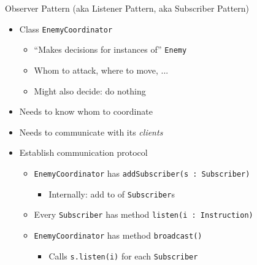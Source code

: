 
\begin{frame}{Observer Pattern (aka Listener Pattern, aka Subscriber Pattern)}
%
\begin{itemize}
\item Class \texttt{EnemyCoordinator}
	\begin{itemize}
	\item \enquote{Makes decisions for instances of} \texttt{Enemy}
	\item Whom to attack, where to move, ...
	\item Might also decide: do nothing
	\end{itemize}
\item[\Thus] Needs to know whom to coordinate
\item[\Thus] Needs to communicate with its \emph{clients}
\pause
\item[\Thus] Establish communication protocol
	\begin{itemize}
	\item \texttt{EnemyCoordinator} has \texttt{addSubscriber(s : Subscriber)}
		\begin{itemize}
		\item Internally: add to  of \texttt{Subscriber}s
		\end{itemize}
	\item Every \texttt{Subscriber} has method \texttt{listen(i : Instruction)}
	\item \texttt{EnemyCoordinator} has method \texttt{broadcast()}
		\begin{itemize}
		\item Calls \texttt{s.listen(i)} for each \texttt{Subscriber}
		\end{itemize}
	\end{itemize}
\end{itemize}
%
\end{frame}


